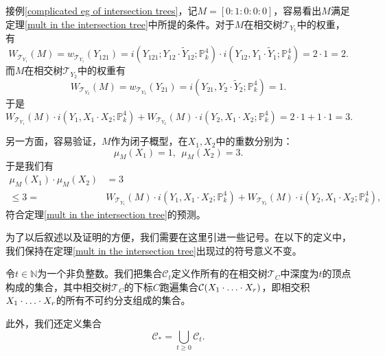 

\begin{example}
接例\ref{complicated eg of intersection trees}，记$M = [0:1:0:0:0]$，容易看出$M$满足定理\ref{mult in the intersection tree}中所提的条件。对于$M$在相交树$\mathscr T_{Y_1}$中的权重，有
\begin{equation}
W_{\mathscr T_{Y_1}}(M) = w_{\mathscr T_{Y_1}}(Y_{121}) = i(Y_{121}; Y_{12}\cdot \widetilde{Y}_{12}; \mathbb{P}_k^4) \cdot i(Y_{12}, Y_1\cdot\widetilde{Y}_1; \mathbb{P}_k^4) = 2\cdot1 = 2.
\end{equation}
而$M$在相交树$\mathscr T_{Y_2}$中的权重有
\begin{equation}
W_{\mathscr T_{Y_2}}(M) = w_{\mathscr T_{Y_2}}(Y_{21}) = i(Y_{21}, Y_2\cdot\widetilde{Y}_2; \mathbb{P}_k^4) = 1.
\end{equation}
于是
\begin{equation}
W_{\mathscr T_{Y_1}}(M) \cdot i(Y_1, X_1 \cdot X_2; \mathbb{P}_k^4) + W_{\mathscr T_{Y_2}}(M) \cdot i(Y_2, X_1 \cdot X_2; \mathbb{P}_k^4) = 2 \cdot 1 + 1 \cdot 1 = 3.
\end{equation}

另一方面，容易验证，$M$作为闭子概型，在$X_1,X_2$中的重数分别为：
\begin{equation}
\mu_M(X_1) = 1, ~~ \mu_M(X_2) = 3.
\end{equation}
于是我们有
\begin{align}
\mu_M(X_1) \cdot \mu_M(X_2) & = 3 \nonumber \\
\leqslant 3 = & W_{\mathscr T_{Y_1}}(M) \cdot i(Y_1, X_1 \cdot X_2; \mathbb{P}_k^4) + W_{\mathscr T_{Y_2}}(M) \cdot i(Y_2, X_1 \cdot X_2; \mathbb{P}_k^4),
\end{align}
符合定理\ref{mult in the intersection tree}的预测。
\end{example}

为了以后叙述以及证明的方便，我们需要在这里引进一些记号。在以下的定义中，我们保持在定理\ref{mult in the intersection tree}出现过的符号意义不变。

\begin{definition} \label{def of C_s}
令$t\in\mathbb{N}$为一个非负整数。我们把集合$\mathcal C_t$定义作所有的在相交树$\mathscr T_C$中深度为$t$的顶点构成的集合，其中相交树$\mathscr T_C$的下标$C$跑遍集合$\mathcal C(X_1\cdot\ldots\cdot X_r)$，即相交积$X_1\cdot\ldots\cdot X_r$的所有不可约分支组成的集合。

此外，我们还定义集合
\begin{equation}
\mathcal C_*=\bigcup\limits_{t\geqslant0}\mathcal C_t.
\end{equation}
\end{definition}

